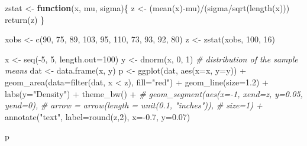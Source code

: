 \documentclass[
]{book}
\newenvironment{Shaded}{\begin{snugshade}}{\end{snugshade}}
\newcommand{\AttributeTok}[1]{\textcolor[rgb]{0.77,0.63,0.00}{#1}}
\newcommand{\CommentTok}[1]{\textcolor[rgb]{0.56,0.35,0.01}{\textit{#1}}}
\newcommand{\ControlFlowTok}[1]{\textcolor[rgb]{0.13,0.29,0.53}{\textbf{#1}}}
\newcommand{\DecValTok}[1]{\textcolor[rgb]{0.00,0.00,0.81}{#1}}
\newcommand{\FloatTok}[1]{\textcolor[rgb]{0.00,0.00,0.81}{#1}}
\newcommand{\FunctionTok}[1]{\textcolor[rgb]{0.00,0.00,0.00}{#1}}
\newcommand{\NormalTok}[1]{#1}
\newcommand{\OtherTok}[1]{\textcolor[rgb]{0.56,0.35,0.01}{#1}}
\newcommand{\SpecialCharTok}[1]{\textcolor[rgb]{0.00,0.00,0.00}{#1}}
\newcommand{\StringTok}[1]{\textcolor[rgb]{0.31,0.60,0.02}{#1}}
\begin{document}
\begin{Shaded}
\begin{Highlighting}[]
\NormalTok{zstat }\OtherTok{\textless{}{-}} \ControlFlowTok{function}\NormalTok{(x, mu, sigma)\{}
\NormalTok{  z }\OtherTok{\textless{}{-}}\NormalTok{ (}\FunctionTok{mean}\NormalTok{(x)}\SpecialCharTok{{-}}\NormalTok{mu)}\SpecialCharTok{/}\NormalTok{(sigma}\SpecialCharTok{/}\FunctionTok{sqrt}\NormalTok{(}\FunctionTok{length}\NormalTok{(x)))}
  \FunctionTok{return}\NormalTok{(z)}
\NormalTok{\}}

\NormalTok{xobs }\OtherTok{\textless{}{-}} \FunctionTok{c}\NormalTok{(}\DecValTok{90}\NormalTok{, }\DecValTok{75}\NormalTok{, }\DecValTok{89}\NormalTok{, }\DecValTok{103}\NormalTok{, }\DecValTok{95}\NormalTok{, }\DecValTok{110}\NormalTok{, }\DecValTok{73}\NormalTok{, }\DecValTok{93}\NormalTok{, }\DecValTok{92}\NormalTok{, }\DecValTok{80}\NormalTok{)}
\NormalTok{z }\OtherTok{\textless{}{-}} \FunctionTok{zstat}\NormalTok{(xobs, }\DecValTok{100}\NormalTok{, }\DecValTok{16}\NormalTok{)}


\NormalTok{x }\OtherTok{\textless{}{-}} \FunctionTok{seq}\NormalTok{(}\SpecialCharTok{{-}}\DecValTok{5}\NormalTok{, }\DecValTok{5}\NormalTok{, }\AttributeTok{length.out=}\DecValTok{100}\NormalTok{)}
\NormalTok{y }\OtherTok{\textless{}{-}} \FunctionTok{dnorm}\NormalTok{(x, }\DecValTok{0}\NormalTok{, }\DecValTok{1}\NormalTok{)}
\CommentTok{\# distribution of the sample means}
\NormalTok{dat }\OtherTok{\textless{}{-}} \FunctionTok{data.frame}\NormalTok{(x, y)}
\NormalTok{p }\OtherTok{\textless{}{-}} \FunctionTok{ggplot}\NormalTok{(dat, }\FunctionTok{aes}\NormalTok{(}\AttributeTok{x=}\NormalTok{x, }\AttributeTok{y=}\NormalTok{y)) }\SpecialCharTok{+}
  \FunctionTok{geom\_area}\NormalTok{(}\AttributeTok{data=}\FunctionTok{filter}\NormalTok{(dat, x }\SpecialCharTok{\textless{}}\NormalTok{ z), }\AttributeTok{fill=}\StringTok{"red"}\NormalTok{) }\SpecialCharTok{+}
  \FunctionTok{geom\_line}\NormalTok{(}\AttributeTok{size=}\FloatTok{1.2}\NormalTok{) }\SpecialCharTok{+}
  \FunctionTok{labs}\NormalTok{(}\AttributeTok{y=}\StringTok{"Density"}\NormalTok{) }\SpecialCharTok{+}
  \FunctionTok{theme\_bw}\NormalTok{() }\SpecialCharTok{+}
  \CommentTok{\# geom\_segment(aes(x={-}1, xend=z, y=0.05, yend=0), }
  \CommentTok{\#              arrow = arrow(length = unit(0.1, "inches")), }
  \CommentTok{\#              size=1) +}
  \FunctionTok{annotate}\NormalTok{(}\StringTok{"text"}\NormalTok{, }\AttributeTok{label=}\FunctionTok{round}\NormalTok{(z,}\DecValTok{2}\NormalTok{), }\AttributeTok{x=}\SpecialCharTok{{-}}\FloatTok{0.7}\NormalTok{, }\AttributeTok{y=}\FloatTok{0.07}\NormalTok{) }
  
\NormalTok{p}
\end{Highlighting}
\end{Shaded}
\end{document}
